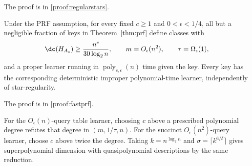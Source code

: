 \noindent The proof is in \cref{proof:regularstars}.
\begin{corollary}\label{cor:fastprf}
Under the PRF assumption, for every fixed $c\ge1$ and $0<\epsilon<1/4$, all but a negligible fraction of keys in Theorem~\ref{thm:prf} define classes with
\[
 \dc(H_{A_s})\ge\frac{n^c}{30\log_2n},\qquad
 m=O_\epsilon(n^2),\qquad\tau=\Omega_\epsilon(1),
\]
and a proper learner running in $\operatorname{poly}_{c,\epsilon}(n)$ time given the key. Every key has the corresponding deterministic improper polynomial-time learner, independently of star-regularity.
\end{corollary}
\noindent The proof is in \cref{proof:fastprf}.

For the $O_\epsilon(n)$-query table learner, choosing $c$ above a prescribed polynomial degree refutes that degree in $(m,1/\tau,n)$. For the succinct $O_\epsilon(n^2)$-query learner, choose $c$ above twice the degree. Taking $k=n^{\log_2n}$ and $\sigma=\lceil k^{6/\delta}\rceil$ gives superpolynomial dimension with quasipolynomial descriptions by the same reduction.
